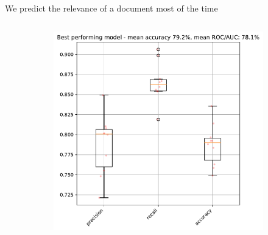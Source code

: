 \documentclass[9pt]{beamer}
\begin{document}
\begin{frame}{We predict the relevance of a document most of the time}
\begin{figure}
	\begin{columns}
		\begin{column}{0.3812\linewidth}
			\begin{figure}
				\includegraphics[width=\linewidth]{../plots/prediction_models/0_relevance_best_performing.pdf}
			\end{figure}
			\begin{figure}

\end{figure}
\end{column}
\end{columns}
\end{figure}
\end{frame}
\end{document}
